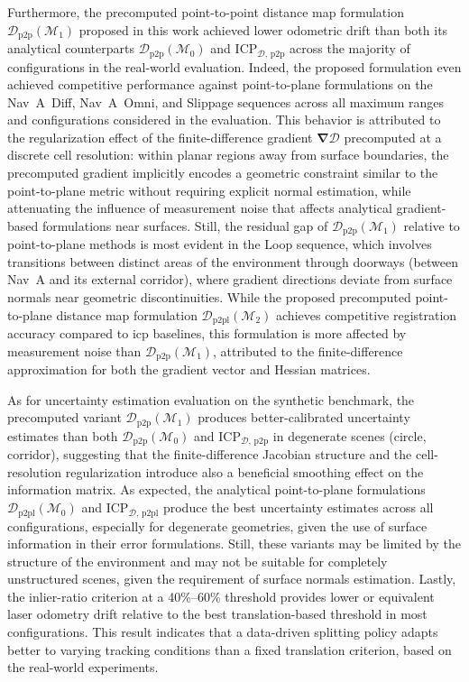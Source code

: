Furthermore, the precomputed point-to-point distance map formulation
$\mathcal{D}_\mathrm{p2p}(\mathcal{M}_1)$ proposed in this work achieved
lower odometric drift than both its analytical counterparts
$\mathcal{D}_\mathrm{p2p}(\mathcal{M}_0)$ and
$\mathrm{ICP}_{\mathcal{D},\,\mathrm{p2p}}$ across the majority of
configurations in the real-world evaluation. Indeed, the proposed formulation
even achieved competitive performance against point-to-plane formulations on
the Nav~A~Diff, Nav~A~Omni, and Slippage sequences across all maximum ranges and
configurations considered in the evaluation. This behavior is attributed to
the regularization effect of the finite-difference gradient
$\bm{\nabla}\mathcal{D}$ precomputed at a discrete cell resolution: within
planar regions away from surface boundaries, the precomputed gradient implicitly
encodes a geometric constraint similar to the point-to-plane metric without
requiring explicit normal estimation, while attenuating the influence of
measurement noise that affects analytical gradient-based formulations near
surfaces. Still, the residual gap of $\mathcal{D}_\mathrm{p2p}(\mathcal{M}_1)$
relative to point-to-plane methods is most evident in the Loop sequence,
which involves transitions between distinct areas of the environment
through doorways (between Nav~A and its external corridor), where gradient
directions deviate from surface normals near geometric discontinuities.
While the proposed precomputed point-to-plane distance map formulation
$\mathcal{D}_\mathrm{p2pl}(\mathcal{M}_2)$
achieves competitive registration accuracy compared to \gls{icp} baselines,
this formulation is more affected by measurement noise than
$\mathcal{D}_\mathrm{p2p}(\mathcal{M}_1)$, attributed to the finite-difference
approximation for both the gradient vector and Hessian matrices.

As for uncertainty estimation evaluation on the synthetic benchmark,
the precomputed variant $\mathcal{D}_\mathrm{p2p}(\mathcal{M}_1)$ produces
better-calibrated uncertainty estimates than both
$\mathcal{D}_\mathrm{p2p}(\mathcal{M}_0)$ and
$\mathrm{ICP}_{\mathcal{D},\,\mathrm{p2p}}$ in degenerate scenes
(circle, corridor), suggesting that the finite-difference Jacobian structure and
the cell-resolution regularization introduce also a beneficial smoothing effect
on the information matrix. As expected, the analytical point-to-plane
formulations $\mathcal{D}_\mathrm{p2pl}(\mathcal{M}_0)$ and
$\mathrm{ICP}_{\mathcal{D},\,\mathrm{p2pl}}$ produce the best uncertainty
estimates across all configurations, especially for degenerate geometries,
given the use of surface information in their error formulations.
Still, these variants may be limited by the structure of the environment and may
not be suitable for completely unstructured scenes, given the requirement of
surface normals estimation. Lastly, the inlier-ratio criterion at a 40\%--60\%
threshold provides lower or equivalent laser odometry drift relative to the best
translation-based threshold in most configurations. This result indicates that
a data-driven splitting policy adapts better to varying
tracking conditions than a fixed translation criterion,
based on the real-world experiments.

